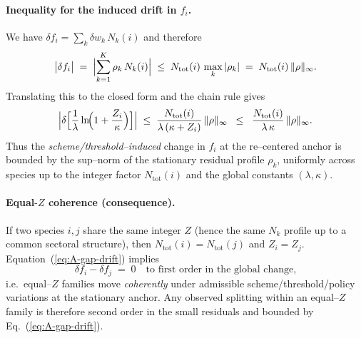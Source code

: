 \documentclass[aps,prd,onecolumn,amsmath,amssymb,superscriptaddress,nofootinbib,showpacs,showkeys]{revtex4-2}
\begin{document}
\paragraph{Inequality for the induced drift in $f_i$.}
We have $\delta f_i=\sum_k \delta w_k\,N_k(i)$ and therefore
\begin{equation}
  \bigl|\delta f_i\bigr|
  \;=\;\Bigl|\sum_{k=1}^K \rho_k\,N_k(i)\Bigr|
  \;\le\; N_{\mathrm{tot}}(i)\,\max_k|\rho_k|
  \;=\;N_{\mathrm{tot}}(i)\,\|\rho\|_{\infty}.
  \label{eq:A-fi-drift}
\end{equation}
Translating this to the closed form %
and the chain rule gives
\begin{equation}
  \Bigl|\delta\Bigl[\frac{1}{\lambda}\ln\!\Bigl(1+\frac{Z_i}{\kappa}\Bigr)\Bigr]\Bigr|
  \;\le\;\frac{N_{\mathrm{tot}}(i)}{\lambda\,(\kappa+Z_i)}\,\|\rho\|_{\infty}
  \;\;\le\;\;\frac{N_{\mathrm{tot}}(i)}{\lambda\,\kappa}\,\|\rho\|_{\infty}.
  \label{eq:A-gap-drift}
\end{equation}
Thus the \emph{scheme/threshold--induced} change in $f_i$ at the re--centered anchor is bounded by the sup--norm of the stationary residual profile $\rho_k$, uniformly across species up to the integer factor $N_{\mathrm{tot}}(i)$ and the global constants $(\lambda,\kappa)$.

\paragraph{Equal\texorpdfstring{$\text{-}Z$}{-Z} coherence (consequence).}
If two species $i,j$ share the same integer $Z$ (hence the same $N_k$ profile up to a common sectoral structure), then $N_{\mathrm{tot}}(i)=N_{\mathrm{tot}}(j)$ and $Z_i=Z_j$. Equation~(\ref{eq:A-gap-drift}) implies
\begin{equation}
  \delta f_i-\delta f_j\;=\;0\quad\text{to first order in the global change,}
  \label{eq:A-equalZ-coherence}
\end{equation}
i.e.\ equal--$Z$ families move \emph{coherently} under admissible scheme/threshold/policy variations at the stationary anchor. Any observed splitting within an equal--$Z$ family is therefore second order in the small residuals and bounded by Eq.~(\ref{eq:A-gap-drift}).
\end{document}
